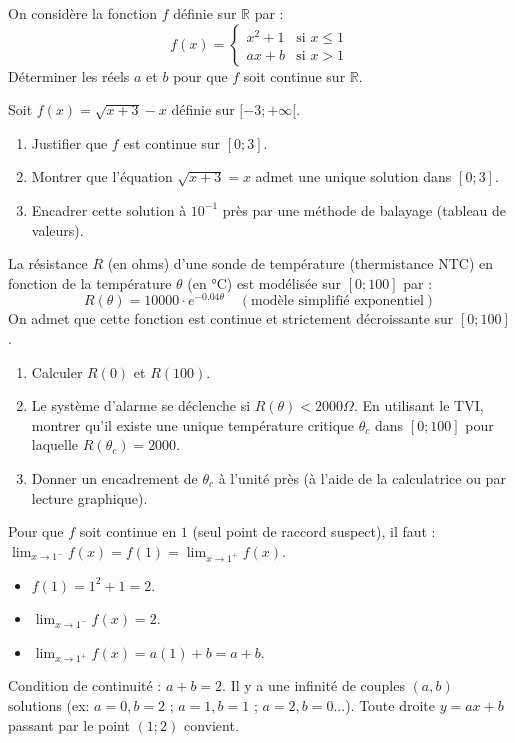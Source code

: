 \documentclass[11pt]{article}
\begin{document}
\begin{exercice}
On considère la fonction $f$ définie sur $\mathbb{R}$ par :
\[
f(x) = \begin{cases}
x^2 + 1 & \text{si } x \le 1 \\
ax + b & \text{si } x > 1
\end{cases}
\]
Déterminer les réels $a$ et $b$ pour que $f$ soit continue sur $\mathbb{R}$.
\end{exercice}

\begin{exercice}
Soit $f(x) = \sqrt{x+3} - x$ définie sur $[-3 ; +\infty[$.
\begin{enumerate}
    \item Justifier que $f$ est continue sur $[0 ; 3]$.
    \item Montrer que l'équation $\sqrt{x+3} = x$ admet une unique solution dans $[0 ; 3]$.
    \item Encadrer cette solution à $10^{-1}$ près par une méthode de balayage (tableau de valeurs).
\end{enumerate}
\end{exercice}

\begin{exercice}
La résistance $R$ (en ohms) d'une sonde de température (thermistance NTC) en fonction de la température $\theta$ (en °C) est modélisée sur $[0 ; 100]$ par :
\[
R(\theta) = 10000 \cdot e^{-0.04 \theta} \quad (\text{modèle simplifié exponentiel})
\]
On admet que cette fonction est continue et strictement décroissante sur $[0 ; 100]$.
\begin{enumerate}
    \item Calculer $R(0)$ et $R(100)$.
    \item Le système d'alarme se déclenche si $R(\theta) < 2000 \Omega$. En utilisant le TVI, montrer qu'il existe une unique température critique $\theta_c$ dans $[0 ; 100]$ pour laquelle $R(\theta_c) = 2000$.
    \item Donner un encadrement de $\theta_c$ à l'unité près (à l'aide de la calculatrice ou par lecture graphique).
\end{enumerate}
\end{exercice}

\begin{corrige}[Exercice 1]
Pour que $f$ soit continue en $1$ (seul point de raccord suspect), il faut :
$\lim_{x \to 1^-} f(x) = f(1) = \lim_{x \to 1^+} f(x)$.
\begin{itemize}
    \item $f(1) = 1^2 + 1 = 2$.
    \item $\lim_{x \to 1^-} f(x) = 2$.
    \item $\lim_{x \to 1^+} f(x) = a(1) + b = a + b$.
\end{itemize}
Condition de continuité : $a + b = 2$.
Il y a une infinité de couples $(a,b)$ solutions (ex: $a=0, b=2$ ; $a=1, b=1$ ; $a=2, b=0$...).
Toute droite $y=ax+b$ passant par le point $(1; 2)$ convient.
\end{corrige}
\end{document}
